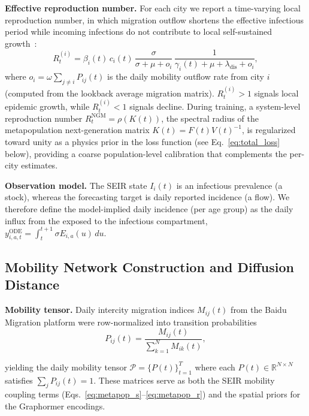 \documentclass[10pt,letterpaper]{article}
\begin{document}
	\noindent\textbf{Effective reproduction number.}
	For each city we report a time-varying local reproduction number, in which
	migration outflow shortens the effective infectious period while incoming
	infections do not contribute to local self-sustained
	growth~\cite{diekmann2010}:
	\begin{equation*}
		R_t^{(i)}
		= \beta_i(t)\,c_i(t)\,
		\frac{\sigma}{\sigma+\mu+o_i}\,
		\frac{1}{\gamma_i(t)+\mu+\lambda_{\mathrm{dis}}+o_i},
	\end{equation*}
	\noindent where $o_i=\omega\sum_{j\neq i} P_{ij}(t)$ is the daily mobility outflow rate from city $i$ (computed
	from the lookback average migration matrix). $R_t^{(i)}>1$ signals local
	epidemic growth, while $R_t^{(i)}<1$ signals decline. During training, a system-level
	reproduction number $R_t^{\mathrm{NGM}} = \rho(K(t))$, the spectral radius of the metapopulation next-generation matrix $K(t)=F(t)V(t)^{-1}$, is regularized toward unity as a physics prior in the loss function (see Eq.~\ref{eq:total_loss} below), providing a coarse population-level calibration that complements the per-city estimates.
	
	\noindent\textbf{Observation model.}
	The SEIR state $I_i(t)$ is an infectious prevalence (a stock), whereas the forecasting target is daily reported incidence (a flow). We therefore define the
	model-implied daily incidence (per age group) as the daily influx from the exposed
	to the infectious compartment,
	$y^{\mathrm{ODE}}_{i,a,t} = \int_{t}^{t+1} \sigma E_{i,a}(u)\,du$.
	
	
	\subsection*{Mobility Network Construction and Diffusion Distance}
	
	\noindent\textbf{Mobility tensor.}
	Daily intercity migration indices $M_{ij}(t)$ from the Baidu Migration
	platform were row-normalized into transition probabilities
	\begin{equation}
		P_{ij}(t) = \frac{M_{ij}(t)}{\sum_{k=1}^{N} M_{ik}(t)},
		\label{eq:mobility_prob}
	\end{equation}
	
	\noindent yielding the daily mobility tensor $\mathcal{P} =
	\{P(t)\}_{t=1}^{T}$ where each $P(t) \in \mathbb{R}^{N \times N}$ satisfies
	$\sum_j P_{ij}(t) = 1$. These matrices serve as both the SEIR mobility
	coupling terms (Eqs.~\ref{eq:metapop_s}--\ref{eq:metapop_r}) and the spatial
	priors for the Graphormer encodings.
	
\end{document}
